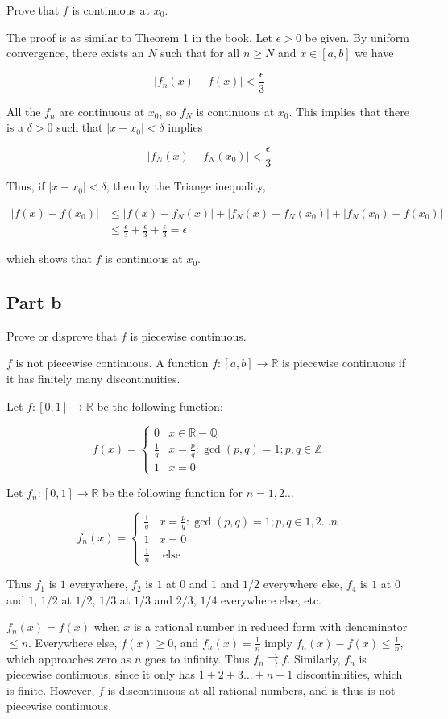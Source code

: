 \documentclass{article}
\newcommand{\R}{\mathbb{R}}
\newcommand{\Q}{\mathbb{Q}}
\newcommand{\Z}{\mathbb{Z}}
\begin{document}
Prove that $f$ is continuous at $x_0$.

The proof is as similar to Theorem 1 in the book. Let $\epsilon > 0$ be given. By uniform convergence, there exists an $N$ such that for all $n \geq N$ and $x \in [a, b]$ we have

\[
|f_n(x) - f(x)| < \frac{\epsilon}{3}
\]

All the $f_n$ are continuous at $x_0$, so $f_N$ is continuous at $x_0$. This implies that there is a $\delta > 0$ such that $|x-x_0| < \delta$ implies

\[
|f_N(x) - f_N(x_0)| < \frac{\epsilon}{3}
\]

Thus, if $|x - x_0| < \delta$, then by the Triange inequality,

\begin{align*}
|f(x) - f(x_0)| &\leq |f(x) - f_N(x)| + |f_N(x) - f_N(x_0)| + |f_N(x_0) - f(x_0)| \\
&\leq \frac{\epsilon}{3} + \frac{\epsilon}{3} +\frac{\epsilon}{3} = \epsilon
\end{align*}

which shows that $f$ is continuous at $x_0$.

\subsection*{Part b}

Prove or disprove that $f$ is piecewise continuous.

$f$ is not piecewise continuous. A function $f: [a, b] \rightarrow \R$ is piecewise continuous if it has finitely many discontinuities.

Let $f: [0, 1] \rightarrow \R$ be the following function:

\[
f(x) = 
\begin{cases}
0 & x \in \R - \Q \\
\frac{1}{q} & x = \frac{p}{q}: \gcd(p, q) = 1; p, q \in \Z \\
1 & x = 0
\end{cases}
\]

Let $f_n: [0, 1] \rightarrow \R$ be the following function for $n = 1, 2 \dots$

\[
f_n(x) = 
\begin{cases}
\frac{1}{q} & x = \frac{p}{q}: \gcd(p, q) = 1; p, q \in 1, 2 \dots n \\
1 & x = 0 \\
\frac{1}{n} & \text{ else}
\end{cases}
\]

Thus $f_1$ is $1$ everywhere, $f_2$ is $1$ at $0$ and $1$ and $1/2$ everywhere else, $f_4$ is $1$ at $0$ and $1$, $1/2$ at $1/2$, $1/3$ at $1/3$ and $2/3$, $1/4$ everywhere else, etc.

$f_n(x) = f(x)$ when $x$ is a rational number in reduced form with denominator $\leq n$. Everywhere else, $f(x) \geq 0$, and $f_n(x) = \frac{1}{n}$ imply $f_n(x) - f(x) \leq \frac{1}{n}$, which approaches zero as $n$ goes to infinity. Thus $f_n \rightrightarrows f$. Similarly, $f_n$ is piecewise continuous, since it only has $1 + 2 + 3 \dots + n-1$ discontinuities, which is finite. However, $f$ is discontinuous at all rational numbers, and is thus is not piecewise continuous.
\end{document}
